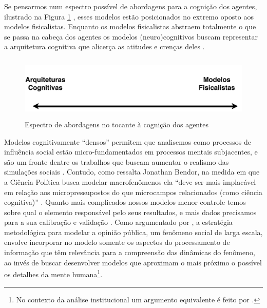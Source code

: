 Se pensarmos num espectro possível de abordagens para a cognição dos agentes,
ilustrado na Figura \ref{fig4} , esses modelos estão posicionados no extremo oposto aos
modelos fisicalistas. Enquanto os modelos fisicalistas abstraem totalmente o que
se passa na cabeça dos agentes os modelos (neuro)cognitivos buscam representar a
arquitetura cognitiva que alicerça as atitudes e crenças
deles \cite{kim2010computational}.

\begin{figure}[H]
  \centering
  \includegraphics[width = \textwidth, height = 3cm]{ims/line.pdf}
  \caption{Espectro de abordagens no tocante à cognição dos agentes}
  \label{fig4}
\end{figure}

Modelos cognitivamente ``densos'' permitem que analisemos como processos de
influência social estão micro-fundamentados em processos mentais subjacentes, e
são um fronte dentre os trabalhos que buscam aumentar o realismo das simulações
sociais \cite{jager2017,epstein2014agent_zero, conte2013minding}. Contudo, como
ressalta Jonathan Bendor, na medida em que a Ciência Política busca modelar
macrofenômenos ela ``deve ser mais implacável em relação aos micropressupostos
do que microcampos relacionados (como ciência cognitiva)''
\cite[p.45]{bendor2010bounded}. Quanto mais complicados nossos modelos menor
controle temos sobre qual o elemento responsável pelo seus resultados, e mais
dados precisamos para a sua calibração e validação \cite{de2005computational}.
Como argumentado por , a estratégia metodológica
para modelar a opinião pública, um fenômeno social de larga escala, envolve
incorporar no modelo somente os aspectos do processamento de informação que têm
relevância para a compreensão das dinâmicas do fenômeno, ao invés de buscar
desenvolver modelos que aproximam o mais próximo o possível os detalhes da mente
humana\footnote{No contexto da análise institucional um argumento equivalente é
  feito por .}.


